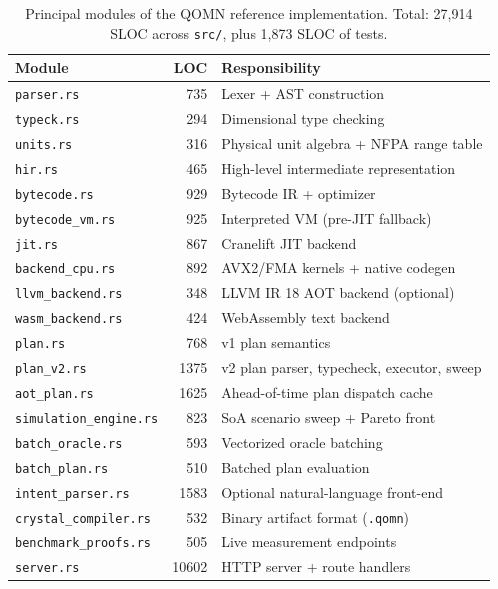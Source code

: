 \documentclass[11pt,a4paper]{article}
\begin{document}
\begin{table}[h]
\centering
\small
\begin{tabular}{lrl}
\toprule
Module & LOC & Responsibility \\
\midrule
\texttt{parser.rs}           &  735 & Lexer + AST construction \\
\texttt{typeck.rs}           &  294 & Dimensional type checking \\
\texttt{units.rs}            &  316 & Physical unit algebra + NFPA range table \\
\texttt{hir.rs}              &  465 & High-level intermediate representation \\
\texttt{bytecode.rs}         &  929 & Bytecode IR + optimizer \\
\texttt{bytecode\_vm.rs}     &  925 & Interpreted VM (pre-JIT fallback) \\
\texttt{jit.rs}              &  867 & Cranelift JIT backend \\
\texttt{backend\_cpu.rs}     &  892 & AVX2/FMA kernels + native codegen \\
\texttt{llvm\_backend.rs}    &  348 & LLVM IR 18 AOT backend (optional) \\
\texttt{wasm\_backend.rs}    &  424 & WebAssembly text backend \\
\texttt{plan.rs}             &  768 & v1 plan semantics \\
\texttt{plan\_v2.rs}         & 1375 & v2 plan parser, typecheck, executor, sweep \\
\texttt{aot\_plan.rs}        & 1625 & Ahead-of-time plan dispatch cache \\
\texttt{simulation\_engine.rs} & 823 & SoA scenario sweep + Pareto front \\
\texttt{batch\_oracle.rs}    &  593 & Vectorized oracle batching \\
\texttt{batch\_plan.rs}      &  510 & Batched plan evaluation \\
\texttt{intent\_parser.rs}   & 1583 & Optional natural-language front-end \\
\texttt{crystal\_compiler.rs} & 532 & Binary artifact format (\texttt{.qomn}) \\
\texttt{benchmark\_proofs.rs} & 505 & Live measurement endpoints \\
\texttt{server.rs}           & 10602 & HTTP server + route handlers \\
\bottomrule
\end{tabular}
\caption{Principal modules of the QOMN reference implementation. Total: 27{,}914 SLOC across \texttt{src/}, plus 1{,}873 SLOC of tests.}
\label{tab:modules}
\end{table}
\end{document}
